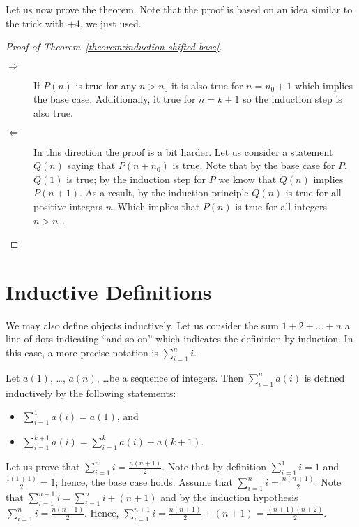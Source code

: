 Let us now prove the theorem. Note that the proof is based on an idea similar
to the trick with $+4$, we just used.
\begin{proof}[Proof of Theorem~\ref{theorem:induction-shifted-base}]
    \begin{description}
        \item[$\Rightarrow$] If $P(n)$ is true for any $n > n_0$ it is also true
            for $n = n_0 + 1$ which implies the base case. Additionally, it true for
            $n = k + 1$ so the induction step is also true.
        \item[$\Leftarrow$] In this direction the proof is a bit harder. Let us
            consider a statement $Q(n)$ saying that $P(n + n_0)$ is true. Note that
            by the base case for $P$, $Q(1)$ is true; by the induction step for $P$
            we know that $Q(n)$ implies $P(n + 1)$. As a result, by the induction
            principle $Q(n)$ is true for all positive integers $n$. Which implies
            that $P(n)$ is true for all integers $n > n_0$.
    \end{description}
\end{proof}

\section{Inductive Definitions}

We may also define objects inductively. Let us consider the sum
$1 + 2 + \dots + n$ a line of dots indicating ``and so on'' which indicates the
definition by induction. In this case, a more precise notation is
$\sum_{i = 1}^n i$.

\begin{definition}
    Let $a(1)$, \dots, $a(n)$, \dots be a sequence of integers. Then
    $\sum_{i = 1}^n a(i)$ is defined inductively by the following
    statements:
    \begin{itemize}
        \item $\sum_{i = 1}^1 a(i) = a(1)$, and
        \item $\sum_{i = 1}^{k + 1} a(i) =
            \sum_{i = 1}^k a(i) + a(k + 1)$.
    \end{itemize}
\end{definition}

Let us prove that $\sum_{i = 1}^n i = \frac{n (n + 1)}{2}$.
Note that by definition $\sum_{i = 1}^1 i = 1$ and
$\frac{1 (1 + 1)}{2} = 1$; hence, the base case holds. Assume that
$\sum_{i = 1}^n i = \frac{n (n + 1)}{2}$. Note that
$\sum_{i = 1}^{n + 1} i = \sum_{i = 1}^n i + (n + 1)$ and by the
induction hypothesis $\sum_{i = 1}^n i = \frac{n (n + 1)}{2}$.
Hence, $\sum_{i = 1}^{n + 1} i = \frac{n (n + 1)}{2} + (n + 1) =
\frac{(n + 1)(n + 2)}{2}$.

